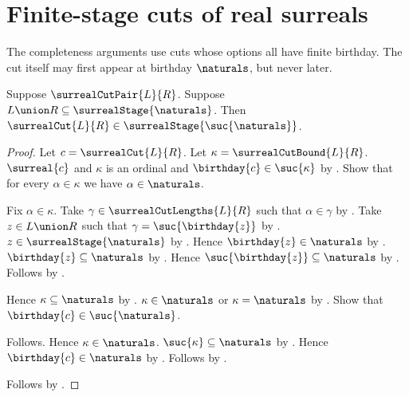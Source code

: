 

\section{Finite-stage cuts of real surreals}

The completeness arguments use cuts whose options all have finite birthday.
The cut itself may first appear at birthday $\naturals$, but never later.

\begin{theorem}\label{finite_stage_surreal_cut_successor_stage}
    Suppose $\surrealCutPair{L}{R}$.
    Suppose $L\union R\subseteq\surrealStage{\naturals}$.
    Then $\surrealCut{L}{R}\in
        \surrealStage{\suc{\naturals}}$.
\end{theorem}
\begin{proof}
    Let $c=\surrealCut{L}{R}$.
    Let $\kappa=\surrealCutBound{L}{R}$.
    $\surreal{c}$ and $\kappa$ is an ordinal and
        $\birthday{c}\in\suc{\kappa}$
        by
        .
    Show that for every $\alpha\in\kappa$ we have
        $\alpha\in\naturals$.
    \begin{subproof}
        Fix $\alpha\in\kappa$.
        Take $\gamma\in\surrealCutLengths{L}{R}$ such that
            $\alpha\in\gamma$
            by .
        Take $z\in L\union R$ such that
            $\gamma=\suc{\birthday{z}}$
            by .
        $z\in\surrealStage{\naturals}$ by .
        Hence $\birthday{z}\in\naturals$
            by
            .
        $\birthday{z}\subseteq\naturals$
            by
            .
        Hence $\suc{\birthday{z}}\subseteq\naturals$
            by .
        Follows by .
    \end{subproof}
    Hence $\kappa\subseteq\naturals$ by .
    $\kappa\in\naturals$ or $\kappa=\naturals$
        by
        .
    Show that $\birthday{c}\in\suc{\naturals}$.
    \begin{subproof}
        \begin{byCase}
                Follows.
                Hence $\kappa\in\naturals$.
                $\suc{\kappa}\subseteq\naturals$
                    by .
                Hence $\birthday{c}\in\naturals$
                    by .
                Follows by .
        \end{byCase}
    \end{subproof}
    Follows by
        .
\end{proof}


